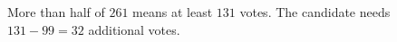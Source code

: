 More than half of $261$ means at least $131$ votes. The candidate needs $131-99=\boxed{32}$ additional votes.
